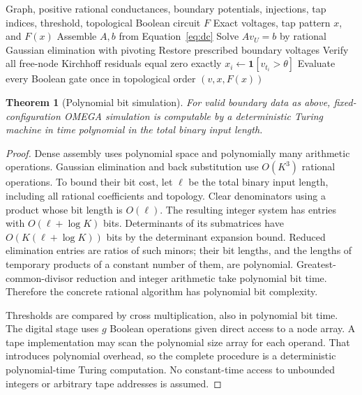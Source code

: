 \documentclass[11pt]{article}
\newtheorem{theorem}{Theorem}
\begin{document}
\begin{algorithm}
\caption{Exact fixed-configuration OMEGA simulation}
\begin{algorithmic}[1]
\Require Graph, positive rational conductances, boundary potentials,
injections, tap indices, threshold, topological Boolean circuit $F$
\Ensure Exact voltages, tap pattern $x$, and $F(x)$
\State Assemble $A,b$ from Equation~\eqref{eq:dc}
\State Solve $Av_U=b$ by rational Gaussian elimination with pivoting
\State Restore prescribed boundary voltages
\State Verify all free-node Kirchhoff residuals equal zero exactly
\State $x_i\gets\mathbf1[v_{t_i}>\theta]$
\EndFor
\State Evaluate every Boolean gate once in topological order
\State \Return $(v,x,F(x))$
\end{algorithmic}
\end{algorithm}

\begin{theorem}[Polynomial bit simulation]
For valid boundary data as above, fixed-configuration OMEGA simulation
is computable by a deterministic Turing machine in time polynomial
in the total binary input length.
\end{theorem}
\begin{proof}
Dense assembly uses polynomial space and polynomially many arithmetic
operations. Gaussian elimination and back substitution use $O(K^3)$
rational operations. To bound their bit cost, let $\ell$ be the total
binary input length, including all rational coefficients and topology.
Clear denominators using a product whose bit length is $O(\ell)$.
The resulting integer system has entries with
$O(\ell+\log K)$ bits. Determinants of its submatrices have
$O(K(\ell+\log K))$ bits by the determinant expansion bound.
Reduced elimination entries are ratios of such minors; their bit
lengths, and the lengths of temporary products of a constant number of
them, are polynomial. Greatest-common-divisor reduction and integer
arithmetic take polynomial bit time. Therefore the concrete rational
algorithm has polynomial bit complexity.

Thresholds are compared by cross multiplication, also in polynomial
bit time. The digital stage uses $g$ Boolean operations given direct
access to a node array. A tape implementation may scan the polynomial
size array for each operand. That introduces polynomial overhead, so
the complete procedure is a deterministic polynomial-time Turing
computation. No constant-time access to unbounded integers or arbitrary
tape addresses is assumed.
\end{proof}
\end{document}
